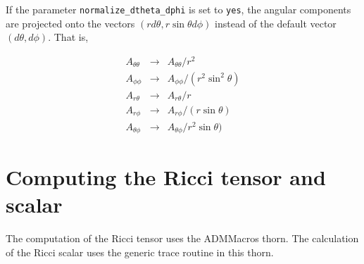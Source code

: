 \documentclass{article}
\begin{document}
If the parameter {\tt normalize\_dtheta\_dphi} is set to {\tt yes}, 
the angular components are projected onto the vectors $(r d\theta, r \sin\theta d \phi)$ instead of the default vector $(d \theta, d\phi)$. That is,

\begin{eqnarray*}
A_{\theta\theta} & \rightarrow & A_{\theta\theta}/r^2
\\
A_{\phi\phi}& \rightarrow & A_{\phi\phi}/(r^2\sin^2\theta)
\\
A_{r\theta} & \rightarrow & A_{r\theta}/r
\\
A_{r\phi} & \rightarrow & A_{r\phi}/(r\sin\theta)
\\
A_{\theta\phi} & \rightarrow & A_{\theta\phi}/r^2\sin\theta)
\end{eqnarray*}

\section{Computing the Ricci tensor and scalar}
\label{sec:ricci}

The computation of the Ricci tensor uses the ADMMacros thorn. The
calculation of the Ricci scalar uses the generic trace routine in this
thorn.

\end{document}
